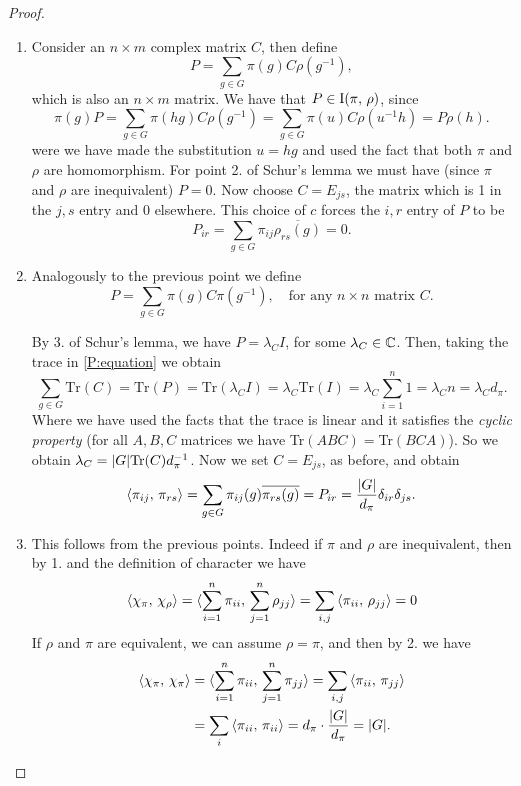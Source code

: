 \begin{proof}~ 
\begin{enumerate}
\item Consider an $n\times m$ complex matrix $C$, then define
\begin{equation*}
P=\sum_{g\in G}\pi(g)C\rho(g^{-1}),
\end{equation*}
which is also an $n\times m$ matrix. We have that $P\in \operatorname{I}(\pi, \, \rho)$, since
\[
\pi(g)P=\sum_{g \in G}\pi(hg)C\rho(g^{-1})=\sum_{g\in G}\pi(u)C\rho(u^{-1}h)=P\rho(h).
\]
were we have made the substitution $u=hg$ and  used the fact that both $\pi$ and $\rho$ are homomorphism. For point 2. of Schur's lemma we must have (since $\pi$ and $\rho$ are inequivalent) $P=0$. Now choose $C=E_{js}$, the matrix which is 1 in the $j,s$ entry and 0 elsewhere. This choice of $c$ forces the $i,r$ entry of $P$ to be 
\[
P_{ir}=\sum_{g\in G}\pi_{ij}\overline{\rho_{rs}(g)}=0.
\]
\item Analogously to the previous point we define 
\begin{equation}
\label{P:equation}
P=\sum_{g\in G}\pi(g)C\pi(g^{-1}), \quad \text{for any $n\times n$ matrix $C$.}
\end{equation}

By 3. of Schur's lemma, we have $P=\lambda_CI$, for some $\lambda_C\in {\mathbb C}$. Then, taking the trace in \ref{P:equation} we obtain
\[
\text{$\sum_{g\in G}$Tr$(C)=$Tr$(P)=$Tr$(\lambda_CI)=\lambda_C$Tr$(I)=\lambda_C\sum_{i=1}^n 1=\lambda_Cn=\lambda_Cd_\pi.$}
\]  
Where we have used the facts that the trace is linear and it satisfies the \emph{cyclic property} (for all $A,B,C$ matrices we have Tr$(ABC)=$Tr$(BCA)$). So we obtain $\lambda_C=\lvert G\rvert \text{Tr$(C)d_\pi^{-1}$}$. Now we set $C=E_{js}$, as before, and obtain 
\[
\braket{\pi_{ij},\, \pi_{rs}}=\sum_{g\in G}\pi_{ij}(g)\overline{\pi_{rs}(g)}=P_{ir}=\frac{\lvert G\rvert}{d_\pi}\delta_{ir}\delta_{js}.
\]
\item This follows from the previous points. Indeed if $\pi$ and $\rho$ are inequivalent, then by 1. and the definition of character we have
\[
\braket{\chi_\pi,\, \chi_\rho}=\braket{\sum_{i=1}^n\pi_{ii},\, \sum_{j=1}^n\rho_{jj} }=\sum_{i,j}\braket{\pi_{ii},\, \rho_{jj} }=0
\]
If $\rho$ and $\pi$ are equivalent, we can assume $\rho=\pi$, and then by 2. we have
\[
\begin{split}
\braket{\chi_\pi,\, \chi_\pi}&=\braket{\sum_{i=1}^n\pi_{ii},\, \sum_{j=1}^n\pi_{jj} }=\sum_{i,j}\braket{\pi_{ii},\, \pi_{jj} }\\
&=\sum_{i}\braket{\pi_{ii},\, \pi_{ii} }=d_\pi\cdot\frac{\lvert G\rvert}{d_\pi}=\lvert G\rvert.
\end{split}
\]
\end{enumerate}
\end{proof}
